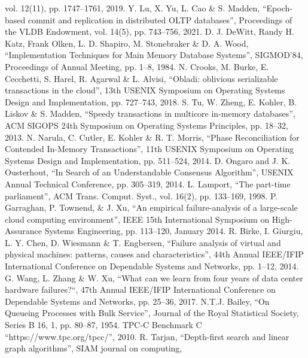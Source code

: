\begin{thebibliography}{00}
  vol. 12(11),
  pp. 1747--1761,
  2019.
  Y. Lu, X. Yu, L. Cao \& S. Madden,
  ``Epoch-based commit and replication in distributed {OLTP} databases'',
  Proceedings of the VLDB Endowment,
  vol. 14(5),
  pp. 743--756,
  2021.
  D. J. DeWitt, Randy H. Katz, Frank Olken, L. D. Shapiro, M. Stonebraker
  \&  D. A. Wood,
  ``Implementation Techniques for Main Memory Database Systems'',
  SIGMOD'84, Proceedings of Annual Meeting,
  pp. 1--8,
  1984.
  N. Crooks, M. Burke, E. Cecchetti, S. Harel, R. Agarwal \& L. Alvisi,
  ``Obladi: oblivious serializable transactions in the cloud'',
  13th {USENIX} Symposium on Operating Systems Design and Implementation,
  pp. 727--743,
  2018.
  S. Tu, W. Zheng, E. Kohler, B. Liskov \& S. Madden,
  ``Speedy transactions in multicore in-memory databases'',
  {ACM} {SIGOPS} 24th Symposium on Operating Systems Principles,
  pp. 18--32,
  2013.
  N. Narula, C. Cutler, E. Kohler \& R. T. Morris,
  ``Phase Reconciliation for Contended In-Memory Transactions'',
  11th {USENIX} Symposium on Operating Systems Design and Implementation,
  pp. 511--524,
  2014.
  D. Ongaro and J. K. Ousterhout,
  ``In Search of an Understandable Consensus Algorithm'',
  {USENIX} Annual Technical Conference,
  pp. 305--319,
  2014.
  L. Lamport,
  ``The part-time parliament'',
  {ACM} Trans. Comput. Syst.,
  vol. 16(2),
  pp. 133--169,
  1998.
  P. Garraghan, P. Townend, \& J. Xu,
  ``An empirical failure-analysis of a large-scale cloud computing environment'',
  IEEE 15th International Symposium on High-Assurance Systems Engineering,
  pp. 113--120,
  January 2014.
  R. Birke, I. Giurgiu, L. Y. Chen, D. Wiesmann \& T. Engbersen,
  ``Failure analysis of virtual and physical machines: patterns, causes and characteristics'',
  44th Annual {IEEE/IFIP} International Conference on Dependable Systems and Networks,
  pp. 1--12,
  2014.
  G. Wang, L. Zhang \& W. Xu,
  ``What can we learn from four years of data center hardware failures?``,
  47th Annual {IEEE/IFIP} International Conference on Dependable Systems and Networks, 
  pp. 25--36,
  2017.  
  N.T.J. Bailey,
  ``On Queueing Processes with Bulk Service'',
  Journal of the Royal Statistical Society, Series B 16, 1,
  pp. 80--87,
  1954.
  TPC-C Benchmark C
  ``https://www.tpc.org/tpcc/'',
  2010.
  R. Tarjan,
  ``Depth-first search and linear graph algorithms'',
  SIAM journal on computing,

\end{thebibliography}
